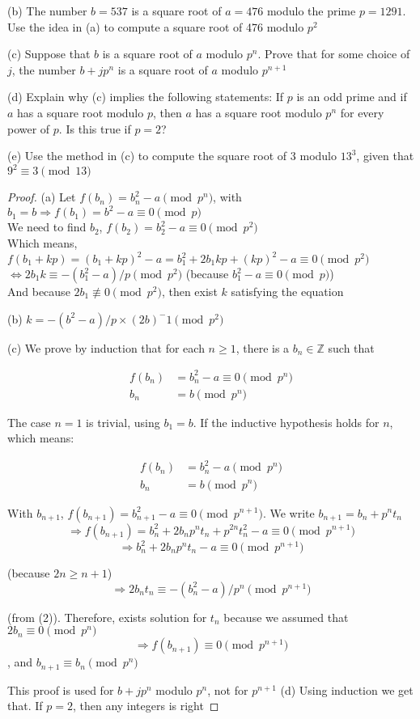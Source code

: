 (b) The number $b=537$ is a square root of $a=476$ modulo the prime $p=1291$. Use the idea in (a) to compute a square root of 476 modulo $p^2$

(c) Suppose that $b$ is a square root of $a$ modulo $p^n$. Prove that for some choice of $j$, the number $b+jp^n$ is a square root of $a$ modulo $p^{n+1}$

(d) Explain why (c) implies the following statements: If $p$ is an odd prime and if $a$ has a square root modulo $p$, then $a$ has a square root modulo $p^n$ for every power of $p$. Is this true if $p=2$?

(e) Use the method in (c) to compute the square root of 3 modulo $13^3$, given that $9^2\equiv 3 \pmod{13}$
\begin{proof}

(a) Let $f(b_n)=b_n^2-a \pmod{p^n}$, with $b_1=b \Rightarrow f(b_1)=b^2-a\equiv 0 \pmod p$ \\ We need to find $b_2$, $f(b_2)=b_2^2-a \equiv 0 \pmod{p^2}$ \\ Which means, $f(b_1+kp)=(b_1+kp)^2-a=b_1^2+2b_1kp+(kp)^2-a \equiv 0 \pmod{p^2}$ \\ $\Leftrightarrow 2b_1k \equiv -(b_1^2-a)/p \pmod{p^2}$ (because $b_1^2-a \equiv 0 \pmod p$) \\ And because $2b_1 \not\equiv 0 \pmod{p^2}$, then exist $k$ satisfying the equation

(b) $k=-(b^2-a)/p \times (2b)^-1 \pmod{p^2}$

(c) We prove by induction that for each $n \geq 1$, there is a $b_n \in \mathbb{Z}$ such that

    \begin{align*}
        f(b_n) & =b_n^2-a \equiv 0 \pmod{p^n} \\
        b_n & = b \pmod{p^n}
    \end{align*}

    The case $n=1$ is trivial, using $b_1=b$. If the inductive hypothesis holds for $n$, which means: 
    
    \begin{align*}
        f(b_n) & = b_n^2 - a \pmod{p^n} \\
        b_n & = b \pmod{p^n} 
    \end{align*}

    With $b_{n+1}$, $f(b_{n+1})=b_{n+1}^2-a \equiv 0 \pmod{p^{n+1}}$. We write $b_{n+1}=b_n+p^nt_n$
    \[\Rightarrow f(b_{n+1})=b_n^2+2b_np^nt_n+p^{2n}t_n^2 - a \equiv 0 \pmod{p^{n+1}}\]
    \[\Rightarrow b_n^2+2b_np^nt_n-a \equiv 0 \pmod{p^{n+1}}\] 
    
    (because $2n \geq n+1$)
    \[\Rightarrow 2b_nt_n \equiv -(b_n^2-a)/p^n \pmod{p^{n+1}}\]
    
    (from (2)). Therefore, exists solution for $t_n$ because we assumed that $2b_n \equiv 0 \pmod{p^{n}}$
    \[\Rightarrow f(b_{n+1}) \equiv 0 \pmod{p^{n+1}}\], and $b_{n+1} \equiv b_n \pmod{p^n}$
    
    This proof is used for $b+jp^n$ modulo $p^n$, not for $p^{n+1}$
(d) Using induction we get that. If $p=2$, then any integers is right

\end{proof}

